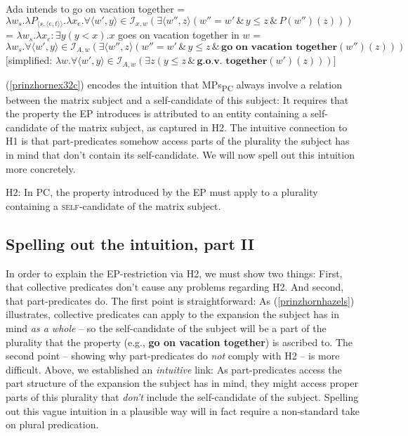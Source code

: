 \documentclass[output=paper,colorlinks,citecolor=brown,
]{langscibook}
\begin{document}
\ea 	\label{prinzhornhazels}
\ea Ada intends to go on vacation together \label{prinzhornex32a}
\ex   {} = $\lambda w_{s}. \lambda P_{\langle s,\langle e,t \rangle \rangle}. \lambda x_{e}. \forall \langle w' ,y \rangle \in \mathcal{I}_{x,w} (\exists \langle w'', z \rangle (w'' = w' \, \& \, y \le z\, \& \,P(w'')(z)))$ \label{prinzhornex32b}
\ex {} = $\lambda w_{s}. \lambda x_{e}: \exists y (y < x). x$ goes on vacation together in $w$\label{prinzhornex32c}
\ex   \sem{}{(\ref{prinzhornex32a})} = $\lambda w_{s}. \forall \langle w' ,y \rangle \in \mathcal{I}_{A,w} (\exists \langle w'', z \rangle (w'' = w' \, \& \, y \le z\, \& \,\textbf{go on vacation together} (w'')(z)))$ \\
$[$simplified: $\lambda w. \forall \langle w' ,y \rangle \in \mathcal{I}_{A,w} (\exists z (y \le z\, \& \,\textbf{g.o.v. together} (w')(z)))]$ \label{prinzhornex32d}
\z\z

(\ref{prinzhornex32c}) encodes the intuition that MPs\textsubscript{PC} always involve a relation between the matrix subject and a self-candidate of this subject: It requires that  the property  the EP introduces is attributed to an entity containing a self-candidate of the matrix subject, as captured in H2. The intuitive connection to H1 is that part-predicates somehow access parts of the plurality the subject has in mind that don't contain its self-candidate. We will now spell out this intuition more concretely.


\ea H2: In PC, the property introduced by the EP must apply to a plurality containing a \textsc{self}-candidate of the matrix subject. \label{prinzhornexr2} \z




\subsection{Spelling out the intuition, part II}\label{prinzhornsec:4.2}

In order to explain the EP-restriction via H2, we must show two things: First,  that collective predicates don't cause any problems regarding H2. And second, that part-predicates do. The first point is straightforward: As (\ref{prinzhornhazels}) illustrates, collective predicates can apply to the expansion the subject has in mind \textit{as a whole} -- so  the self-candidate of the subject will  be a part of the plurality that the property (e.g., \textbf{go on vacation together})  is ascribed to. The second point -- showing why part-predicates do \textit{not}  comply with H2 -- is more difficult. Above, we established an \textit{intuitive} link: As part-predicates access the part structure of the expansion the subject has in mind, they might access proper parts of this plurality that \textit{don't} include the self-candidate of the subject. Spelling out this vague intuition in a plausible way will in fact require a non-standard take on plural predication.
\end{document}
